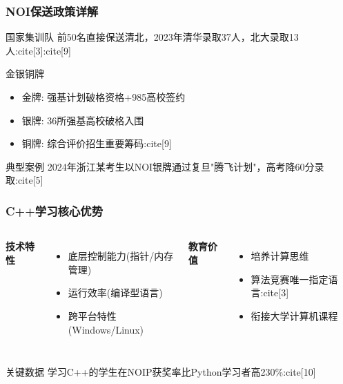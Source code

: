 \documentclass[aspectratio=169,UTF8]{beamer}
\begin{document}
\begin{frame}
\frametitle{NOI保送政策详解}
\begin{block}{国家集训队}
前50名直接保送清北，2023年清华录取37人，北大录取13人:cite[3]:cite[9]
\end{block}

\begin{block}{金银铜牌}
\begin{itemize}
    \item 金牌: 强基计划破格资格+985高校签约
    \item 银牌: 36所强基高校破格入围
    \item 铜牌: 综合评价招生重要筹码:cite[9]
\end{itemize}
\end{block}

\begin{exampleblock}{典型案例}
2024年浙江某考生以NOI银牌通过复旦"腾飞计划"，高考降60分录取:cite[5]
\end{exampleblock}
\end{frame}

\begin{frame}
\frametitle{C++学习核心优势}
\begin{columns}
\textbf{技术特性}
\begin{itemize}
    \item 底层控制能力(指针/内存管理)
    \item 运行效率(编译型语言)
    \item 跨平台特性(Windows/Linux)
\end{itemize}

\textbf{教育价值}
\begin{itemize}
    \item 培养计算思维
    \item 算法竞赛唯一指定语言:cite[3]
    \item 衔接大学计算机课程
\end{itemize}
\end{columns}

\vspace{5mm}
\begin{alertblock}{关键数据}
学习C++的学生在NOIP获奖率比Python学习者高230\%:cite[10]
\end{alertblock}
\end{frame}

\end{document}
